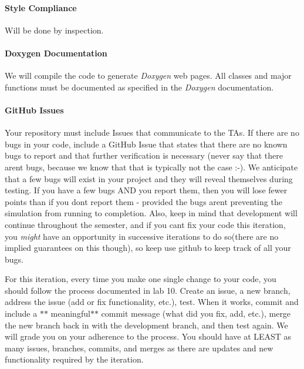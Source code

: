 \paragraph*{Style Compliance}

Will be done by inspection.

\paragraph*{Doxygen Documentation}

We will compile the code to generate {\itshape Doxygen} web pages. All classes and major functions must be documented as specified in the {\itshape Doxygen} documentation.

\paragraph*{Git\+Hub Issues}

Your repository must include Issues that communicate to the T\+As. If there are no bugs in your code, include a Git\+Hub Issue that states that there are no known bugs to report and that further verification is necessary (never say that there aren\textquotesingle{}t bugs, because we know that that is typically not the case \+:-\/). We anticipate that a few bugs will exist in your project and they will reveal themselves during testing. If you have a few bugs A\+ND you report them, then you will lose fewer points than if you don\textquotesingle{}t report them -\/ provided the bugs aren\textquotesingle{}t preventing the simulation from running to completion. Also, keep in mind that development will continue throughout the semester, and if you can\textquotesingle{}t fix your code this iteration, you {\itshape might} have an opportunity in successive iterations to do so(there are no implied guarantees on this though), so keep use github to keep track of all your bugs.

For this iteration, every time you make one single change to your code, you should follow the process documented in lab 10. Create an issue, a new branch, address the issue (add or fix functionality, etc.), test. When it works, commit and include a $\ast$$\ast$ meaningful$\ast$$\ast$ commit message (what did you fix, add, etc.), merge the new branch back in with the development branch, and then test again. We will grade you on your adherence to the process. You should have at L\+E\+A\+ST as many issues, branches, commits, and merges as there are updates and new functionality required by the iteration.

